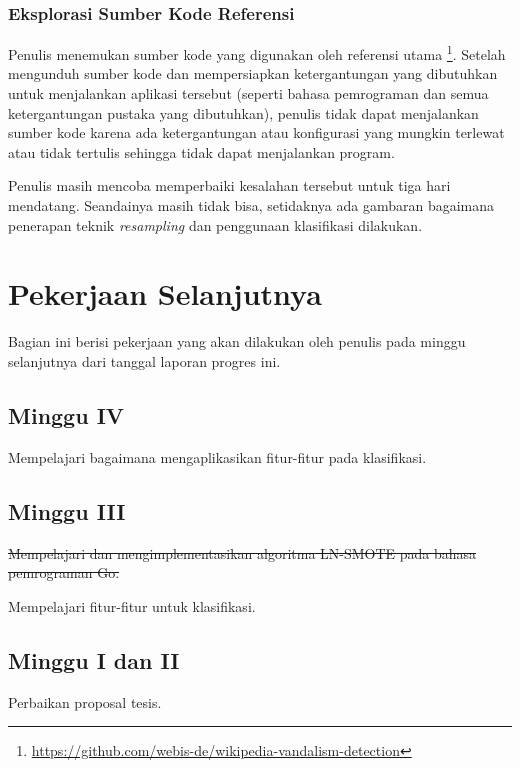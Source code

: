 \documentclass[12pt,a4paper,titlepage]{article}
\begin{document}
\subsubsection{Eksplorasi Sumber Kode Referensi}

Penulis menemukan sumber kode yang digunakan oleh referensi utama
\footnote{
	\url{https://github.com/webis-de/wikipedia-vandalism-detection}
}.
Setelah mengunduh sumber kode dan mempersiapkan ketergantungan yang dibutuhkan untuk menjalankan aplikasi tersebut (seperti bahasa pemrograman dan semua ketergantungan pustaka yang dibutuhkan), penulis tidak dapat menjalankan sumber kode karena ada ketergantungan atau konfigurasi yang mungkin terlewat atau tidak tertulis sehingga tidak dapat menjalankan program.

Penulis masih mencoba memperbaiki kesalahan tersebut untuk tiga hari mendatang.
Seandainya masih tidak bisa, setidaknya ada gambaran bagaimana penerapan teknik \textit{resampling} dan penggunaan klasifikasi dilakukan.

\section{Pekerjaan Selanjutnya}

Bagian ini berisi pekerjaan yang akan dilakukan oleh penulis pada minggu selanjutnya dari tanggal laporan progres ini.

\subsection{Minggu IV}

Mempelajari bagaimana mengaplikasikan fitur-fitur pada klasifikasi.

\subsection{Minggu III}

\sout{
Mempelajari dan mengimplementasikan algoritma LN-SMOTE pada bahasa pemrograman Go.
}

Mempelajari fitur-fitur untuk klasifikasi.

\subsection{Minggu I dan II}

Perbaikan proposal tesis.

\end{document}

